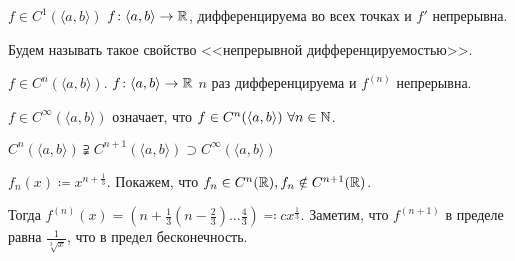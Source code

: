 \begin{definition}
    $f \in C^1(\langle a, b \rangle)$  $f\!: \langle a, b \rangle \to \mathbb{R}$, дифференцируема во всех точках и  $f'$ непрерывна.

    Будем называть такое свойство <<непрерывной дифференцируемостью>>.
\end{definition}
\begin{definition}
    $f \in C^n(\langle a, b \rangle)$. $f\!: \langle a, b \rangle \to \mathbb{R}$  $n$ раз дифференцируема и  $f^{(n)}$ непрерывна.
\end{definition}
\begin{definition}
    $f \in C^{\infty}(\langle a, b \rangle)$ означает, что  $f \in C^n(\langle a, b \rangle)\ \forall n \in \mathbb{N}$.
\end{definition}
\begin{remark}
    $C^n(\langle a, b \rangle) \supsetneqq C^{n+1}(\langle a, b \rangle) \supset C^{\infty}(\langle a, b \rangle)$
\end{remark}
\begin{example}
    $f_n(x) \coloneqq x^{n + \frac{1}{3}}$. Покажем, что $f_n \in C^n(\mathbb{R}), f_n \notin C^{n+1}(\mathbb{R})$.

    Тогда  $f^{(n)}(x) = (n+\frac{1}{3}(n-\frac{2}{3})\ldots \frac{4}{3}) \eqqcolon cx^{\frac{1}{3}}$. Заметим, что $f^{(n+1)}$ в пределе равна  $\frac{1}{\sqrt[3]{x}}$, что в предел бесконечность.
\end{example}

